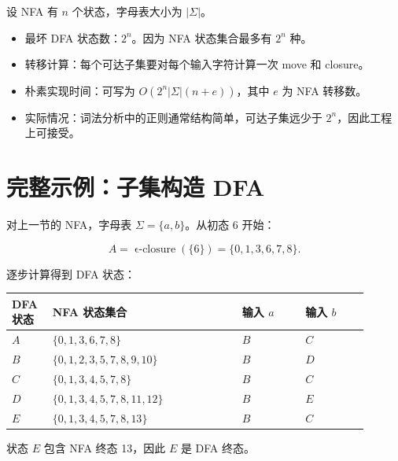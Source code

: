 \documentclass[UTF8,fontset=none,11pt]{ctexart}
\newcommand{\eclose}{\operatorname{\epsilon\text{-}closure}}
\begin{document}
设 NFA 有 \(n\) 个状态，字母表大小为 \(|\Sigma|\)。

\begin{itemize}
  \item 最坏 DFA 状态数：\(2^n\)。因为 NFA 状态集合最多有 \(2^n\) 种。
  \item 转移计算：每个可达子集要对每个输入字符计算一次 move 和 closure。
  \item 朴素实现时间：可写为 \(O(2^n|\Sigma|(n+e))\)，其中 \(e\) 为 NFA 转移数。
  \item 实际情况：词法分析中的正则通常结构简单，可达子集远少于 \(2^n\)，因此工程上可接受。
\end{itemize}

\section{完整示例：子集构造 DFA}

对上一节的 NFA，字母表 \(\Sigma=\{a,b\}\)。从初态 6 开始：

\[
A=\eclose(\{6\})=\{0,1,3,6,7,8\}.
\]

逐步计算得到 DFA 状态：

\begin{longtable}{L{0.10\linewidth}L{0.48\linewidth}L{0.16\linewidth}L{0.16\linewidth}}
\toprule
DFA 状态 & NFA 状态集合 & 输入 \(a\) & 输入 \(b\) \\
\midrule
\(A\) & \(\{0,1,3,6,7,8\}\) & \(B\) & \(C\) \\
\(B\) & \(\{0,1,2,3,5,7,8,9,10\}\) & \(B\) & \(D\) \\
\(C\) & \(\{0,1,3,4,5,7,8\}\) & \(B\) & \(C\) \\
\(D\) & \(\{0,1,3,4,5,7,8,11,12\}\) & \(B\) & \(E\) \\
\(E\) & \(\{0,1,3,4,5,7,8,13\}\) & \(B\) & \(C\) \\
\bottomrule
\end{longtable}

状态 \(E\) 包含 NFA 终态 13，因此 \(E\) 是 DFA 终态。

\begin{center}
\end{center}
\end{document}

